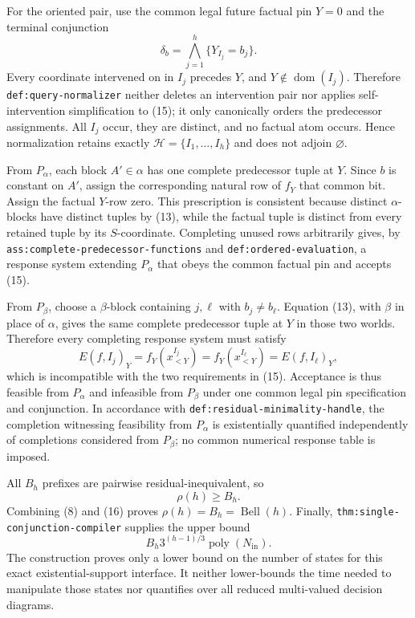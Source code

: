 For the oriented pair, use the common legal future factual pin \(Y=0\) and the terminal conjunction
\[
 \delta_b=\bigwedge_{j=1}^h\{Y_{I_j}=b_j\}.
\tag{15}
\]
Every coordinate intervened on in \(I_j\) precedes \(Y\), and \(Y\notin\operatorname{dom}(I_j)\).  Therefore \texttt{def:query-normalizer} neither deletes an intervention pair nor applies self-intervention simplification to (15); it only canonically orders the predecessor assignments.  All \(I_j\) occur, they are distinct, and no factual atom occurs.  Hence normalization retains exactly \(\mathcal H=\{I_1,\ldots,I_h\}\) and does not adjoin \(\varnothing\).

From \(P_\alpha\), each block \(A'\in\alpha\) has one complete predecessor tuple at \(Y\).  Since \(b\) is constant on \(A'\), assign the corresponding natural row of \(f_Y\) that common bit.  Assign the factual \(Y\)-row zero.  This prescription is consistent because distinct \(\alpha\)-blocks have distinct tuples by (13), while the factual tuple is distinct from every retained tuple by its \(S\)-coordinate.  Completing unused rows arbitrarily gives, by \texttt{ass:complete-predecessor-functions} and \texttt{def:ordered-evaluation}, a response system extending \(P_\alpha\) that obeys the common factual pin and accepts (15).

From \(P_\beta\), choose a \(\beta\)-block containing \(j,\ell\) with \(b_j\neq b_\ell\).  Equation (13), with \(\beta\) in place of \(\alpha\), gives the same complete predecessor tuple at \(Y\) in those two worlds.  Therefore every completing response system must satisfy
\[
 E(f,I_j)_Y=f_Y(x^{I_j}_{<Y})
 =f_Y(x^{I_\ell}_{<Y})=E(f,I_\ell)_Y,
\]
which is incompatible with the two requirements in (15).  Acceptance is thus feasible from \(P_\alpha\) and infeasible from \(P_\beta\) under one common legal pin specification and conjunction.  In accordance with \texttt{def:residual-minimality-handle}, the completion witnessing feasibility from \(P_\alpha\) is existentially quantified independently of completions considered from \(P_\beta\); no common numerical response table is imposed.

All \(B_h\) prefixes are pairwise residual-inequivalent, so
\[
 \rho(h)\geq B_h.
\tag{16}
\]
Combining (8) and (16) proves \(\rho(h)=B_h=\operatorname{Bell}(h)\).  Finally, \texttt{thm:single-conjunction-compiler} supplies the upper bound
\[
 B_h3^{(h-1)/3}\operatorname{poly}(N_{\mathrm{in}}).
\]
The construction proves only a lower bound on the number of states for this exact existential-support interface.  It neither lower-bounds the time needed to manipulate those states nor quantifies over all reduced multi-valued decision diagrams.

